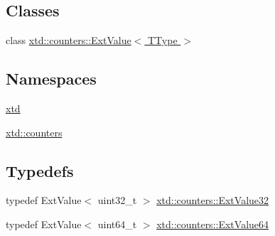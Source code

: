 \subsection*{Classes}
\begin{DoxyCompactItemize}
\item 
class \hyperlink{classxtd_1_1counters_1_1ExtValue}{xtd\-::counters\-::\-Ext\-Value$<$ T\-Type $>$}
\end{DoxyCompactItemize}
\subsection*{Namespaces}
\begin{DoxyCompactItemize}
\item 
\hyperlink{namespacextd}{xtd}
\item 
\hyperlink{namespacextd_1_1counters}{xtd\-::counters}
\end{DoxyCompactItemize}
\subsection*{Typedefs}
\begin{DoxyCompactItemize}
\item 
typedef Ext\-Value$<$ uint32\-\_\-t $>$ \hyperlink{namespacextd_1_1counters_ae049cff0f00adb1728a511d333c2aa50}{xtd\-::counters\-::\-Ext\-Value32}
\item 
typedef Ext\-Value$<$ uint64\-\_\-t $>$ \hyperlink{namespacextd_1_1counters_ad0d26d26ad71069f92a20b6d870e4872}{xtd\-::counters\-::\-Ext\-Value64}
\end{DoxyCompactItemize}
